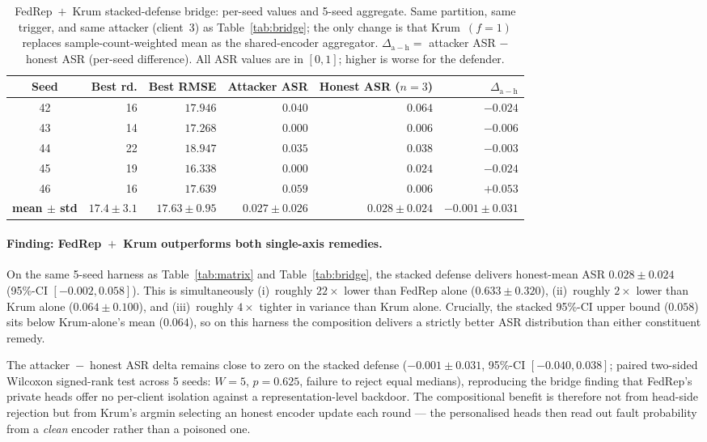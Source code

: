 \documentclass[preprint,12pt,authoryear]{elsarticle}
\begin{document}
\begin{table}[!ht]
\centering
\footnotesize
\setlength{\tabcolsep}{4pt}
\renewcommand{\arraystretch}{1.15}
\caption{FedRep~$+$~Krum stacked-defense bridge: per-seed values
and 5-seed aggregate. Same partition, same trigger, and same
attacker (client~3) as Table~\ref{tab:bridge}; the only change is
that Krum~$(f = 1)$ replaces sample-count-weighted mean as the
shared-encoder aggregator.
$\Delta_{\mathrm{a-h}} = $ attacker ASR $-$ honest ASR (per-seed
difference). All ASR values are in $[0, 1]$; higher is worse for
the defender.}
\label{tab:stacked}
\begin{tabular}{@{}crrrrr@{}}
\toprule
Seed & Best rd. & Best RMSE & Attacker ASR & Honest ASR ($n{=}3$) & $\Delta_{\mathrm{a-h}}$ \\
\midrule
42 & 16 & $17.946$ & $0.040$ & $0.064$ & $-0.024$ \\
43 & 14 & $17.268$ & $0.000$ & $0.006$ & $-0.006$ \\
44 & 22 & $18.947$ & $0.035$ & $0.038$ & $-0.003$ \\
45 & 19 & $16.338$ & $0.000$ & $0.024$ & $-0.024$ \\
46 & 16 & $17.639$ & $0.059$ & $0.006$ & $+0.053$ \\
\midrule
\textbf{mean $\pm$ std} & $\mathbf{17.4 \pm 3.1}$ & $\mathbf{17.63 \pm 0.95}$ & $\mathbf{0.027 \pm 0.026}$ & $\mathbf{0.028 \pm 0.024}$ & $\mathbf{-0.001 \pm 0.031}$ \\
\bottomrule
\end{tabular}
\end{table}

\paragraph{Finding: FedRep~$+$~Krum outperforms both single-axis remedies.}
On the same 5-seed harness as Table~\ref{tab:matrix} and
Table~\ref{tab:bridge}, the stacked defense delivers honest-mean
ASR $0.028 \pm 0.024$ (95\%-CI $[-0.002, 0.058]$). This is
simultaneously (i)~roughly $22\times$ lower than FedRep alone
($0.633 \pm 0.320$), (ii)~roughly $2\times$ lower than Krum alone
($0.064 \pm 0.100$), and (iii)~roughly $4\times$ tighter in variance
than Krum alone. Crucially, the stacked 95\%-CI upper bound
($0.058$) sits below Krum-alone's mean ($0.064$), so on this
harness the composition delivers a strictly better ASR distribution
than either constituent remedy.

The attacker~$-$~honest ASR delta remains close to zero on the
stacked defense ($-0.001 \pm 0.031$, 95\%-CI $[-0.040, 0.038]$;
paired two-sided Wilcoxon signed-rank test across 5 seeds:
$W = 5$, $p = 0.625$, failure to reject equal medians), reproducing
the bridge finding that FedRep's private heads offer no per-client
isolation against a representation-level backdoor. The compositional
benefit is therefore not from head-side rejection but from Krum's
argmin selecting an honest encoder update each round --- the
personalised heads then read out fault probability from a
\emph{clean} encoder rather than a poisoned one.
\end{document}
